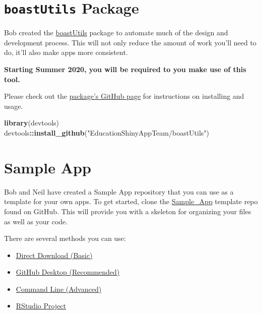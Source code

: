 \documentclass[
]{book}
\newenvironment{Shaded}{\begin{snugshade}}{\end{snugshade}}
\newcommand{\KeywordTok}[1]{\textcolor[rgb]{0.13,0.29,0.53}{\textbf{#1}}}
\newcommand{\NormalTok}[1]{#1}
\newcommand{\OperatorTok}[1]{\textcolor[rgb]{0.81,0.36,0.00}{\textbf{#1}}}
\newcommand{\StringTok}[1]{\textcolor[rgb]{0.31,0.60,0.02}{#1}}
\providecommand{\tightlist}{%
  \setlength{\itemsep}{0pt}\setlength{\parskip}{0pt}}
\begin{document}
\hypertarget{boastutils-package}{%
\section{\texorpdfstring{\texttt{boastUtils} Package}{boastUtils Package}}\label{boastutils-package}}

Bob created the \href{https://github.com/EducationShinyAppTeam/boastUtils}{boastUtils} package to automate much of the design and development process. This will not only reduce the amount of work you'll need to do, it'll also make apps more consistent.

\textbf{Starting Summer 2020, you will be required to you make use of this tool.}

Please check out the \href{https://github.com/EducationShinyAppTeam/boastUtils}{package's GitHub page} for instructions on installing and usage.

\begin{Shaded}
\begin{Highlighting}[]
\KeywordTok{library}\NormalTok{(devtools)}
\NormalTok{devtools}\OperatorTok{::}\KeywordTok{install_github}\NormalTok{(}\StringTok{"EducationShinyAppTeam/boastUtils"}\NormalTok{)}
\end{Highlighting}
\end{Shaded}

\hypertarget{sample-app}{%
\section{Sample App}\label{sample-app}}

Bob and Neil have created a Sample App repository that you can use as a template for your own apps. To get started, clone the \href{https://github.com/EducationShinyAppTeam/Sample_App}{Sample\_App} template repo found on GitHub. This will provide you with a skeleton for organizing your files as well as your code.

There are several methods you can use:

\begin{itemize}
\tightlist
\item
  \protect\hyperlink{direct-download}{Direct Download (Basic)}
\item
  \protect\hyperlink{github-desktop}{GitHub Desktop (Recommended)}
\item
  \protect\hyperlink{command-line}{Command Line (Advanced)}
\item
  \protect\hyperlink{rstudio-project}{RStudio Project}
\end{itemize}
\end{document}
